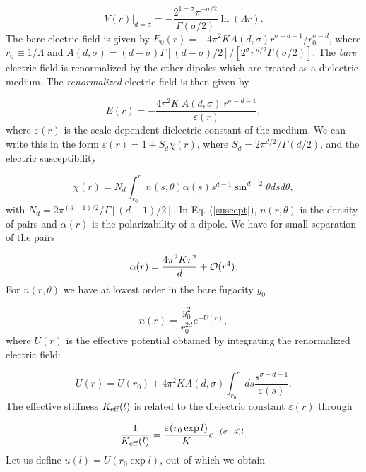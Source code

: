 \documentclass[a4paper,showpacs,preprintnumbers,amsmath,amssymb,prl,twocolumn]{revtex4}
\begin{document}
\begin{equation}
\label{logpot}
V(r)|_{d=\sigma}=-\frac{2^{1-\sigma}\pi^{-\sigma/2}}{\Gamma(\sigma/2)}
\ln(\Lambda r).
\end{equation}
The bare electric field is given by 
$E_0(r)=-4\pi^2K A(d,\sigma)r^{\sigma-d-1}/r_0^{\sigma-d}$, where 
$r_0\equiv 1/\Lambda$ and 
$A(d,\sigma)=(d-\sigma)\Gamma[(d-\sigma)/2]/[2^\sigma\pi^{d/2}\Gamma
(\sigma/2)]$. The  {\it bare} electric field is renormalized by the other 
dipoles which are treated as a dielectric medium. The {\it renormalized} 
electric field is then given by

\begin{equation} 
E(r)=-\frac{4\pi^2K  ~ A(d,\sigma) ~r^{\sigma-d-1}}{\varepsilon(r)}, 
\end{equation}
where $\varepsilon(r)$ is the scale-dependent dielectric constant of the 
medium. We can write this in the form $\varepsilon(r)=1+S_d\chi(r)$, where 
$S_d=2\pi^{d/2}/\Gamma(d/2)$, and the electric susceptibility  

\begin{equation}
\label{suscept}
\chi(r)=N_d\int_{r_0}^r n(s,\theta)\alpha(s) s^{d-1}\sin^{d-2}\theta 
ds d\theta,
\end{equation}
with $N_d=2\pi^{(d-1)/2}/\Gamma[(d-1)/2]$. In Eq. (\ref{suscept}), 
$n(r,\theta)$ is the density of pairs and $\alpha(r)$ is the 
polarizability of a dipole. We have for small separation of the pairs 

\begin{equation}
\alpha(r)=\frac{4\pi^2K r^2}{d}+{\cal O}(r^4).
\end{equation}
For $n(r,\theta)$ we have at lowest order in the bare fugacity $y_0$

\begin{equation}
n(r)=\frac{y_0^2}{r_0^{2d}}e^{-U(r)},
\end{equation}
where $U(r)$ is the effective potential obtained by integrating the 
renormalized electric field:

\begin{equation}
\label{effpot}
U(r)=U(r_0)+4\pi^2
K A(d,\sigma)\int_{r_0}^{r}ds \frac{s^{\sigma-d-1}}{\varepsilon(s)}.
\end{equation}
The effective stiffness $K_{\rm eff}(l)$ is related to the dielectric constant 
$\varepsilon(r)$ through

\begin{equation}
\label{stiffness}
\frac{1}{K_{\rm eff}(l)}=\frac{\varepsilon(r_0\exp l)}{K}e^{-(\sigma-d)l}.
\end{equation}
Let us define $u(l)=U(r_0\exp l)$, out of which we obtain 
\end{document}
